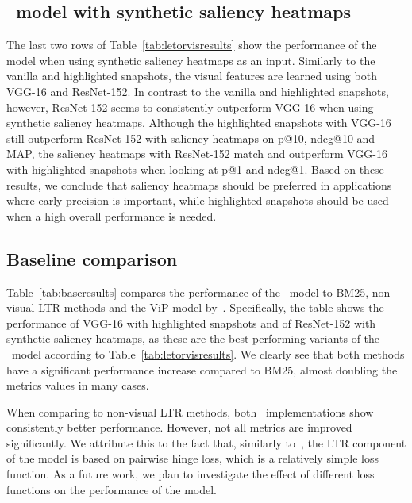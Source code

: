 \subsection{\modelname~model with synthetic saliency heatmaps}
The last two rows of Table~\ref{tab:letorvisresults} show the performance of the \modelname{} mo\-del when using synthetic saliency heatmaps as an input.
Similarly to the vanilla and highlighted snapshots, the visual features are learned using both VGG-16 and ResNet-152.
In contrast to the vanilla and highlighted snapshots, however, ResNet-152 seems to consistently outperform VGG-16 when using synthetic saliency heatmaps.
Although the highlighted snapshots with VGG-16 still outperform ResNet-152 with saliency heatmaps on p@10, ndcg@10 and MAP, the saliency heatmaps with ResNet-152 match and outperform VGG-16 with highlighted snapshots when looking at p@1 and ndcg@1.
Based on these results, we conclude that saliency heatmaps should be preferred in applications where early precision is important,
while highlighted snapshots should be used when a high overall performance is needed.


\subsection{Baseline comparison}
Table~\ref{tab:baseresults} compares the performance of the \modelname~model to BM25, non-visual \ac{LTR} methods and the ViP model by~\citet{fan2017learning}. 
Specifically, the table shows the performance of VGG-16 with highlighted snapshots and of ResNet-152 with synthetic saliency heatmaps, as these are the best-performing variants of the \modelname~model according to Table~\ref{tab:letorvisresults}.
We clearly see that both methods have a significant performance increase compared to BM25, almost doubling the metrics values in many cases.

When comparing to non-visual \ac{LTR} methods, both \modelname~implementations show consistently better performance.
However, not all metrics are improved significantly.
We attribute this to the fact that, similarly to~\cite{fan2017learning}, the \ac{LTR} component of the \modelname{} model is based on pairwise hinge loss, which is a relatively simple loss function.
As a future work, we plan to investigate the effect of different loss functions on the performance of the \modelname{} model.

